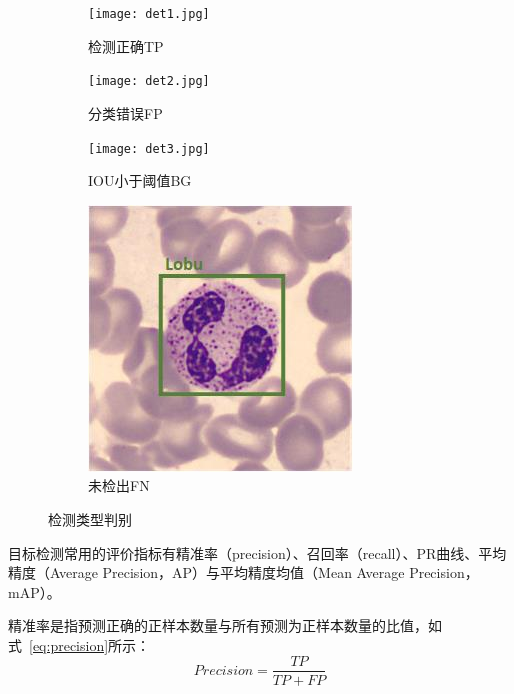 \begin{figure}[htbp]
	\centering
	\begin{subfigure}{0.24\linewidth}
		\centering
		\texttt{[image: det1.jpg]}
    \caption{检测正确TP}
	\end{subfigure}
	\centering
	\begin{subfigure}{0.24\linewidth}
		\centering
		\texttt{[image: det2.jpg]}
    \caption{分类错误FP}
	\end{subfigure}
	\centering
	\begin{subfigure}{0.24\linewidth}
		\centering
		\texttt{[image: det3.jpg]}
    \caption{IOU小于阈值BG}
	\end{subfigure}
	\centering
	\begin{subfigure}{0.24\linewidth}
		\centering
		\includegraphics[width=0.95\linewidth, height=0.95\linewidth]{det4.jpg}
    \caption{未检出FN}
	\end{subfigure}
	\caption{检测类型判别}
	\label{fig:confusion}
\end{figure}

目标检测常用的评价指标有精准率（precision）、召回率（recall）、PR曲线、平均精度（Average Precision，AP）与平均精度均值（Mean Average Precision，mAP）。

精准率是指预测正确的正样本数量与所有预测为正样本数量的比值，如式~\ref{eq:precision}所示：
\begin{equation}               
  Precision = \frac{TP}{TP + FP}
  \label{eq:precision}     
\end{equation} 

